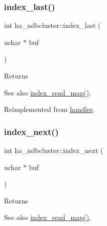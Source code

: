 \mbox{\label{classha__ndbcluster_a6f6e9347ec700ee952a998fa88ae68b2}} 
\subsubsection{\texorpdfstring{index\+\_\+last()}{index\_last()}}
{\footnotesize\ttfamily int ha\+\_\+ndbcluster\+::index\+\_\+last (\begin{DoxyParamCaption}\item[{uchar $\ast$}]{buf }\end{DoxyParamCaption})\hspace{0.3cm}{\ttfamily [virtual]}}

\begin{DoxyReturn}{Returns}

\end{DoxyReturn}
\begin{DoxySeeAlso}{See also}
\mbox{\hyperlink{classhandler_af8c2b258691e5baac8dd22d19c084b37}{index\+\_\+read\+\_\+map()}}. 
\end{DoxySeeAlso}


Reimplemented from \mbox{\hyperlink{classhandler_aa1d62ffab7408a031b13e547eb58be09}{handler}}.

\mbox{\label{classha__ndbcluster_a865afdc25ee4ca42fafde872e476e0ff}} 
\subsubsection{\texorpdfstring{index\+\_\+next()}{index\_next()}}
{\footnotesize\ttfamily int ha\+\_\+ndbcluster\+::index\+\_\+next (\begin{DoxyParamCaption}\item[{uchar $\ast$}]{buf }\end{DoxyParamCaption})\hspace{0.3cm}{\ttfamily [virtual]}}

\begin{DoxyReturn}{Returns}

\end{DoxyReturn}
\begin{DoxySeeAlso}{See also}
\mbox{\hyperlink{classhandler_af8c2b258691e5baac8dd22d19c084b37}{index\+\_\+read\+\_\+map()}}. 
\end{DoxySeeAlso}


